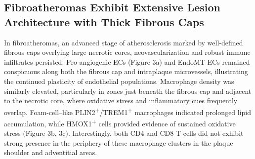 \documentclass[a4paper,12pt]{article}
\begin{document}
\subsection{Fibroatheromas Exhibit Extensive Lesion Architecture with Thick Fibrous Caps}
In fibroatheromas, an advanced stage of atherosclerosis marked by well-defined fibrous caps overlying large necrotic cores, neovascularization and robust immune infiltrates persisted. Pro-angiogenic ECs (Figure 3a) and EndoMT ECs remained conspicuous along both the fibrous cap and intraplaque microvessels, illustrating the continued plasticity of endothelial populations. Macrophage density was similarly elevated, particularly in zones just beneath the fibrous cap and adjacent to the necrotic core, where oxidative stress and inflammatory cues frequently overlap. Foam-cell–like PLIN2\textsuperscript{+}/TREM1\textsuperscript{+} macrophages indicated prolonged lipid accumulation, while HMOX1\textsuperscript{+} cells provided evidence of sustained oxidative stress (Figure 3b, 3c). Interestingly, both CD4 and CD8 T cells did not exhibit strong presence in the periphery of these macrophage clusters in the plaque shoulder and adventitial areas.
\end{document}
